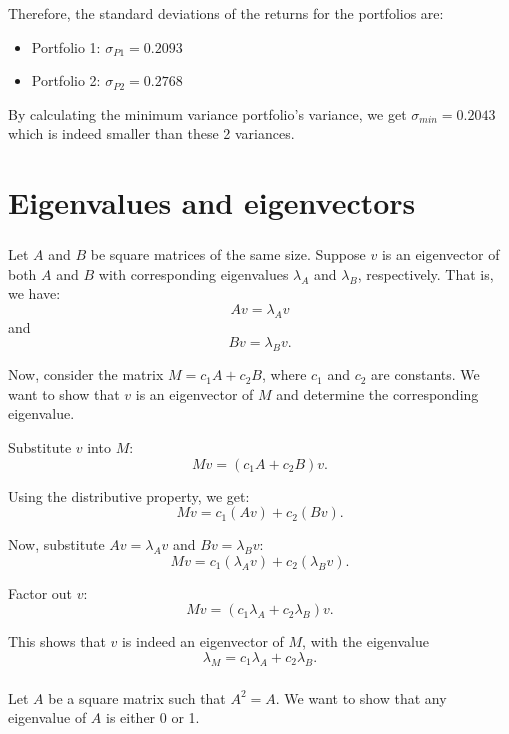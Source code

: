 \documentclass{article}
\begin{document}
Therefore, the standard deviations of the returns for the portfolios are:
\begin{itemize}
    \item Portfolio 1: \( \sigma_{P1} = 0.2093 \)
    \item Portfolio 2: \( \sigma_{P2} = 0.2768 \)
\end{itemize}
By calculating the minimum variance portfolio's variance,
we get $\sigma_{min} = 0.2043$ which is indeed smaller than these 2 variances.


\part*{Eigenvalues and eigenvectors}
\section{}
Let \( A \) and \( B \) be square matrices of the same size. Suppose \( v \) is an eigenvector of both \( A \) and \( B \) with corresponding eigenvalues \( \lambda_A \) and \( \lambda_B \), respectively. That is, we have:
\[
    A v = \lambda_A v
\]
and
\[
    B v = \lambda_B v.
\]

Now, consider the matrix \( M = c_1 A + c_2 B \), where \( c_1 \) and \( c_2 \) are constants. We want to show that \( v \) is an eigenvector of \( M \) and determine the corresponding eigenvalue.

Substitute \( v \) into \( M \):
\[
    M v = (c_1 A + c_2 B) v.
\]

Using the distributive property, we get:
\[
    M v = c_1 (A v) + c_2 (B v).
\]

Now, substitute \( A v = \lambda_A v \) and \( B v = \lambda_B v \):
\[
    M v = c_1 (\lambda_A v) + c_2 (\lambda_B v).
\]

Factor out \( v \):
\[
    M v = (c_1 \lambda_A + c_2 \lambda_B) v.
\]

This shows that \( v \) is indeed an eigenvector of \( M \), with the eigenvalue
\[
    \lambda_M = c_1 \lambda_A + c_2 \lambda_B.
\]

\section{}
Let \( A \) be a square matrix such that \( A^2 = A \).
We want to show that any eigenvalue of \( A \) is either 0 or 1.
\end{document}
